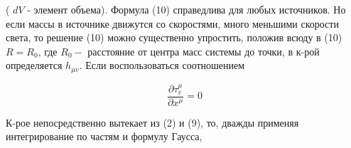 \documentclass[10pt]{article}
\begin{document}
( $d V$ - элемент объема). Формула (10) справедлива для любых источников. Но если массы в источнике движутся со скоростями, много меньшими скорости света, то решение (10) можно существенно упростить, положив всюду в (10) $R=R_{0}$, где $R_{0}-$ расстояние от центра масс системы до точки, в к-рой определяется $h_{\mu v}$. Если воспользоваться соотношением



\[

\frac{\partial \tau_{v}^{\mu}}{\partial x^{\mu}}=0

\]



К-рое непосредственно вытекает из (2) и (9), то, дважды применяя интегрирование по частям и формулу Гаусса,
\end{document}
